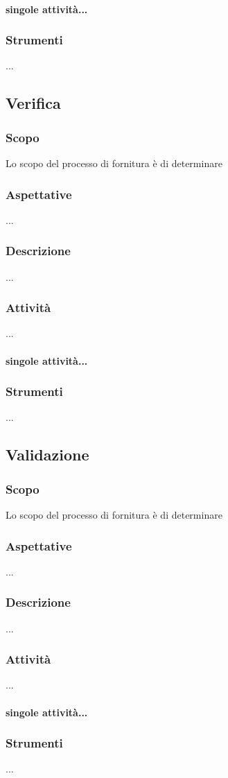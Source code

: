     \paragraph{singole attività...}
    \subsubsection{Strumenti}
    ...

\subsection{Verifica}
    \subsubsection{Scopo}
    Lo scopo del processo di fornitura è di determinare
    \subsubsection{Aspettative}
    ...
    \subsubsection{Descrizione}
    ...
    \subsubsection{Attività}
    ...
    \paragraph{singole attività...}
    \subsubsection{Strumenti}
    ...

\subsection{Validazione}
    \subsubsection{Scopo}
    Lo scopo del processo di fornitura è di determinare
    \subsubsection{Aspettative}
    ...
    \subsubsection{Descrizione}
    ...
    \subsubsection{Attività}
    ...
    \paragraph{singole attività...}
    \subsubsection{Strumenti}
    ...